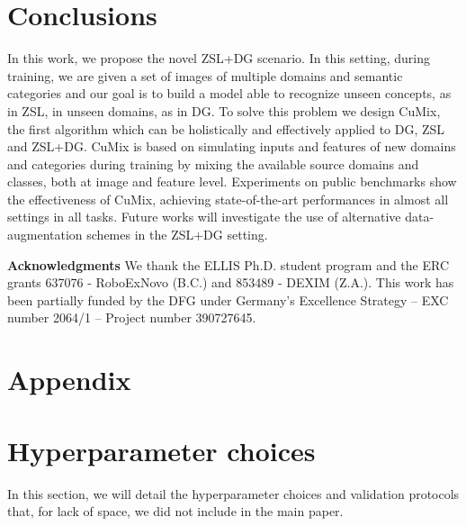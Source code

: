 \documentclass[runningheads]{llncs}
\newcommand{\myparagraph}[1]{\noindent\textbf{#1}}
\newcommand{\methodName}{{CuMix} }
\begin{document}
 
\section{Conclusions}
In this work, we propose the novel ZSL+DG scenario. In this setting, during training,
{we are given a set of images of multiple domains and semantic categories and our goal is to build a model able to recognize unseen concepts, as in ZSL, in unseen domains, as in DG.} To solve this problem we design CuMix, the first algorithm which can be holistically and effectively applied to DG, ZSL and ZSL+DG. \methodName is based on simulating inputs and features of new domains and categories during training by mixing the available source domains and classes, both at image and feature level. 
Experiments on public benchmarks show the effectiveness of CuMix, achieving state-of-the-art performances in almost all settings in all tasks. Future works will investigate the use of alternative data-augmentation schemes in the ZSL+DG setting.

\myparagraph{\newline Acknowledgments}
We thank the ELLIS Ph.D. student program and the ERC grants 637076 - RoboExNovo (B.C.) and 853489 - DEXIM (Z.A.). This work has been partially funded by the DFG under Germany’s Excellence Strategy – EXC number 2064/1 – Project number 390727645.
 







\section*{\Large Appendix}
\appendix

\section{Hyperparameter choices}
In this section, we will detail the hyperparameter choices and validation protocols that, for lack of space, we did not include in the main paper.
\end{document}
